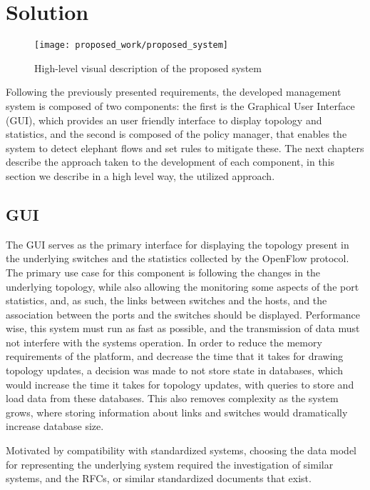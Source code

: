 \section {Solution}

\begin{figure} [h]
    \centering
    \texttt{[image: proposed\_work/proposed\_system]}
    \caption{High-level visual description of the proposed system} \label{fig:pro_sys}
\end{figure}

Following the previously presented requirements, the developed management system is composed of two components: the first is the  Graphical User Interface (GUI), which provides an user friendly interface to display topology and 
statistics, and the second is composed of the policy manager, that enables the system to detect elephant flows and set rules to mitigate these. The next chapters describe the approach taken to the development of each component,
in this section we describe in a high level way, the utilized approach.

\subsection {GUI}

The GUI serves as the primary interface for displaying the topology present in the underlying switches and the statistics collected by the OpenFlow protocol. The primary use case for this component is following the changes 
in the underlying topology, while also allowing the monitoring some aspects of the port statistics, and, as such, the links between switches and the hosts, and the association between the ports and the switches should be displayed. 
Performance wise, this system must run as fast as possible, and the transmission of data must not interfere with the systems operation. In order to reduce the memory requirements of the platform, and decrease the time that 
it takes for drawing topology updates, a decision was made to not store state in databases, which would increase the time it takes for topology updates, with queries to store and load data from these databases. This also 
removes complexity as the system grows, where storing information about links and switches would dramatically increase database size.

\par Motivated by compatibility with standardized systems, choosing the data model for representing the underlying system required the investigation of similar systems, and the RFCs, or similar standardized documents that exist. 

